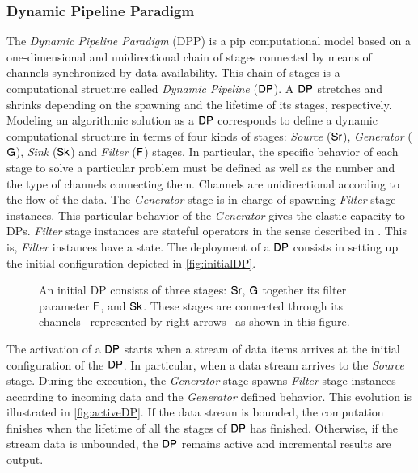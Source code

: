 \subsubsection{Dynamic Pipeline Paradigm}\label{sec:dp}
The \textit{Dynamic Pipeline Paradigm} (DPP) \cite{dpdef} is a \acrshort{pip} computational model based on a one-dimensional and unidirectional chain of stages connected by means of channels synchronized by data availability. 
This chain of stages is a computational structure called \textit{Dynamic Pipeline} ($\mathsf{DP}$). A $\mathsf{DP}$ stretches and shrinks depending on the spawning and the lifetime of its stages, respectively. Modeling an algorithmic 
solution as a $\mathsf{DP}$ corresponds to define a dynamic computational structure in terms of four kinds of stages: \textit{Source} ($\mathsf{Sr}$), \textit{Generator} ($\mathsf{G}$), \textit{Sink} ($\mathsf{Sk}$) and \textit{Filter} ($\mathsf{F}$) stages. 
In particular, the specific behavior of each stage to solve a particular problem must be defined as well as the number and the type of channels connecting them. Channels are unidirectional according to the flow of the data. 
The \textit{Generator} stage is in charge of spawning \textit{Filter} stage instances. This particular behavior of the \textit{Generator} gives the elastic capacity to DPs. \textit{Filter} stage instances are stateful operators in the 
sense described in \cite{hr19}. This is, \textit{Filter} instances have a state.  
The deployment of a $\mathsf{DP}$ consists in setting up the initial configuration depicted in \autoref{fig:initialDP}. 
\begin{figure}[h]
\centering
{}
\caption[{[Pre] Initial configuration of a DP}]{ An initial DP consists of three stages: $\mathsf{Sr}$, $\mathsf{G}$ together its filter parameter $\mathsf{F}$, and $\mathsf{Sk}$. These stages are connected through its channels --represented by right arrows-- as shown in this figure.}
\label{fig:initialDP}
\end{figure}
The activation of a $\mathsf{DP}$ starts when a stream of data items arrives at the initial configuration of the $\mathsf{DP}$. 
In particular, when a data stream arrives to the \textit{Source} stage. During the execution, the \textit{Generator} stage spawns \textit{Filter} stage instances according to incoming data and the \textit{Generator} defined behavior. 
This evolution is illustrated in  \autoref{fig:activeDP}. 
If the data stream is bounded, the computation finishes when the lifetime of all the stages of $\mathsf{DP}$ has finished. Otherwise, if the stream data is unbounded, 
the $\mathsf{DP}$ remains active and incremental results are output. 


